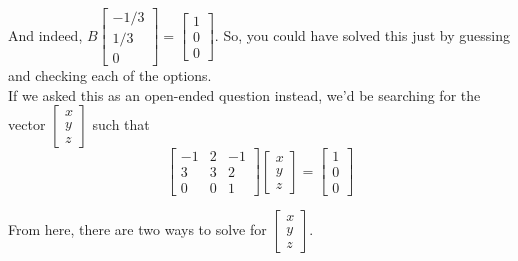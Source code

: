 \documentclass[11pt]{article}
\begin{document}
\begin{prob}
\begin{subprob}
\begin{solution}
And indeed, $B \begin{bmatrix} -1/3 \\ 1/3 \\ 0 \end{bmatrix} = \begin{bmatrix} 1 \\ 0 \\ 0 \end{bmatrix}$. So, you could have solved this just by guessing and checking each of the options. \\

If we asked this as an open-ended question instead, we'd be searching for the vector $\begin{bmatrix} x \\ y \\ z \end{bmatrix}$ such that $$\begin{bmatrix} -1 & 2 & -1 \\ 3 & 3 & 2 \\ 0 & 0 & 1 \end{bmatrix} \begin{bmatrix} x \\ y \\ z \end{bmatrix} = \begin{bmatrix} 1 \\ 0 \\ 0 \end{bmatrix}$$

From here, there are two ways to solve for $\begin{bmatrix} x \\ y \\ z \end{bmatrix}$.


\end{solution}
\end{subprob}
\end{prob}
\end{document}

